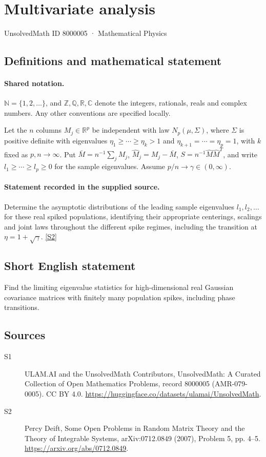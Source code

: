 \documentclass[11pt]{article}
\newcommand{\sref}[2]{\hyperlink{source:#1:#2}{[S#2]}}
\begin{document}
\setcounter{section}{8000004}
\section{Multivariate analysis}\label{8000005}
{\small\sffamily UnsolvedMath ID 8000005 · Mathematical Physics}
\subsection{Definitions and mathematical statement}

\paragraph{Shared notation.}$\mathbb N=\{1,2,\ldots\}$, and $\mathbb Z,\mathbb Q,\mathbb R,\mathbb C$ denote the integers, rationals, reals and complex numbers. Any other conventions are specified locally.


Let the $n$ columns $M_j\in\mathbb R^p$ be independent with law $N_p(\mu,\Sigma)$, where $\Sigma$ is positive definite with eigenvalues $\eta_1\ge\cdots\ge\eta_k>1$ and $\eta_{k+1}=\cdots=\eta_p=1$, with $k$ fixed as $p,n\to\infty$. Put $\bar M=n^{-1}\sum_j M_j$, $\widehat M_j=M_j-\bar M$, $S=n^{-1}\widehat M\widehat M^T$, and write $l_1\ge\cdots\ge l_p\ge0$ for the sample eigenvalues. Assume $p/n\to\gamma\in(0,\infty)$.
\paragraph{Statement recorded in the supplied source.}
Determine the asymptotic distributions of the leading sample eigenvalues $l_1,l_2,\ldots$ for these real spiked populations, identifying their appropriate centerings, scalings and joint laws throughout the different spike regimes, including the transition at $\eta=1+\sqrt\gamma$. \sref{8000005}{2}
\subsection{Short English statement}
Find the limiting eigenvalue statistics for high-dimensional real Gaussian covariance matrices with finitely many population spikes, including phase transitions.
\subsection{Sources}
\begin{description}
\item[\hypertarget{source:8000005:1}{S1}] ULAM.AI and the UnsolvedMath Contributors, UnsolvedMath: A Curated Collection of Open Mathematics Problems, record 8000005 (AMR-079-0005). CC BY 4.0. \url{https://huggingface.co/datasets/ulamai/UnsolvedMath}.
\item[\hypertarget{source:8000005:2}{S2}] Percy Deift, Some Open Problems in Random Matrix Theory and the Theory of Integrable Systems, arXiv:0712.0849 (2007), Problem 5, pp. 4--5. \url{https://arxiv.org/abs/0712.0849}.
\end{description}
\label{end:8000005}
\end{document}

